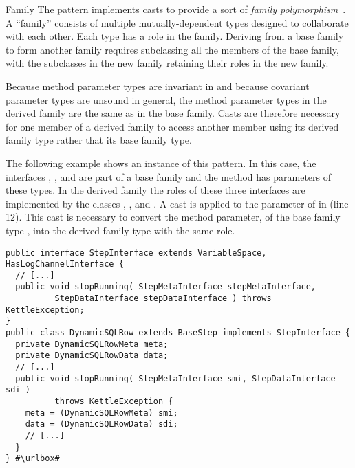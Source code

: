 \begin{pattern}{Family}
The \thisp{} pattern implements casts to provide a sort of
\emph{family polymorphism}~\citep{ernstFamilyPolymorphism2001}.
A ``family'' consists of multiple mutually-dependent types designed to
collaborate with each other.
Each type has a role in the family.
Deriving from a base family to form another family requires subclassing all the members of the base family,
with the subclasses in the new family retaining their roles in the new family.

Because method parameter types are invariant in \java{} and because covariant parameter types are unsound in general,
the method parameter types in the derived family are the same as in the base family.
Casts are therefore necessary for one member of a derived family to access
another member using its derived family type rather that its base family
type.


\instances{}
The following example shows an instance of this pattern.
In this case, the interfaces , ,
and  are part of a base family and the
 method has parameters of these types.
In the derived family the roles of these three interfaces are
implemented by the classes
,
, and
.
A cast is applied to the parameter  of  in
 (line 12).
This cast is necessary to convert the method parameter,
of the base family type ,
into the derived family type with the same role.
\def\urlvar{http://bit.ly/pentaho_pentaho_kettle_2FN59J8}
\begin{verbatim}
public interface StepInterface extends VariableSpace, HasLogChannelInterface {
  // [...]
  public void stopRunning( StepMetaInterface stepMetaInterface,
          StepDataInterface stepDataInterface ) throws KettleException;
}
public class DynamicSQLRow extends BaseStep implements StepInterface {
  private DynamicSQLRowMeta meta;
  private DynamicSQLRowData data;
  // [...]
  public void stopRunning( StepMetaInterface smi, StepDataInterface sdi )
          throws KettleException {
    meta = (DynamicSQLRowMeta) smi;
    data = (DynamicSQLRowData) sdi;
    // [...]
  }
} #\urlbox#
\end{verbatim}


\end{pattern}
